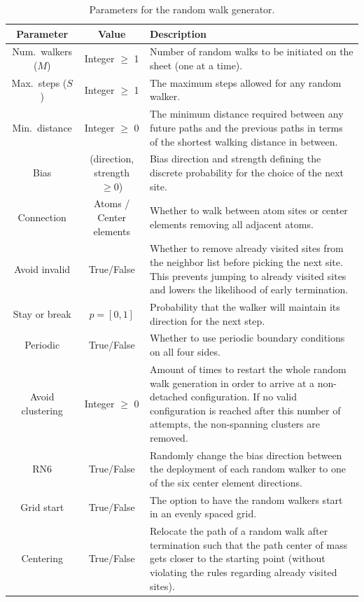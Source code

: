 \begin{table}[h]
  \begin{center}
  \caption{Parameters for the random walk generator.}
  \label{tab:RW_params}
  \begin{tabular}{ | c | c | m{8cm} |} \hline
  \textbf{Parameter} & \textbf{Value} & \textbf{Description}  \\ \hline
  Num.\ walkers ($M$) & Integer $\ge$ 1 & Number of random walks to be initiated on the sheet (one at a time). \\ \hline
  Max.\ steps ($S$)  & Integer $\ge$ 1 &The maximum steps allowed for any random walker. \\ \hline
  Min.\ distance  & Integer $\ge$ 0 &The minimum distance required between any future paths and the previous paths in terms of the shortest walking distance in between. \\ \hline
  Bias  & (direction, strength $\ge0$) & Bias direction and strength defining the discrete probability for the choice of the next site. \\ \hline
  Connection  & Atoms / Center elements & Whether to walk between atom sites or center elements removing all adjacent atoms. \\ \hline
  Avoid invalid  & True/False & Whether to remove already visited sites from the neighbor list before picking the next site. This prevents jumping to already visited sites and lowers the likelihood of early termination.  \\ \hline
  Stay or break  & $p = [0,1]$ & Probability that the walker will maintain its direction for the next step. \\ \hline
  Periodic  & True/False & Whether to use periodic boundary conditions on all four sides. \\ \hline
  Avoid clustering  & Integer $\ge$ 0 & Amount of times to restart the whole random walk generation in order to arrive at a non-detached configuration. If no valid configuration is reached after this number of attempts, the non-spanning clusters are removed.\\ \hline
  RN6  & True/False & Randomly change the bias direction between the deployment of each random walker to one of the six center element directions. \\ \hline
  Grid start  & True/False & The option to have the random walkers start in an evenly spaced grid. \\ \hline
  Centering  & True/False & Relocate the path of a random walk after termination such that the path center of mass gets closer to the starting point (without violating the rules regarding already visited sites).\\ \hline
  \end{tabular}
  \end{center}
\end{table}

